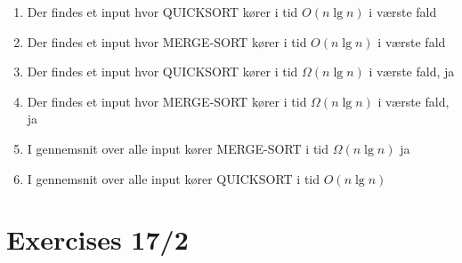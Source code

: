 \documentclass{article}
\theoremstyle{definition}
\begin{document}
\begin{enumerate}
    \item Der findes et input hvor QUICKSORT kører i tid $O(n \lg n)$ i værste fald
    \item Der findes et input hvor MERGE-SORT kører i tid $O(n \lg n)$ i værste fald
    \item Der findes et input hvor QUICKSORT kører i tid $\Omega(n \lg n)$ i værste fald, ja
    \item Der findes et input hvor MERGE-SORT kører i tid $\Omega(n \lg n)$ i værste fald, ja
    \item I gennemsnit over alle input kører MERGE-SORT i tid $\Omega(n \lg n)$ ja
    \item I gennemsnit over alle input kører QUICKSORT i tid $O(n \lg n)$
\end{enumerate}


\section{Exercises 17/2}
\end{document}
